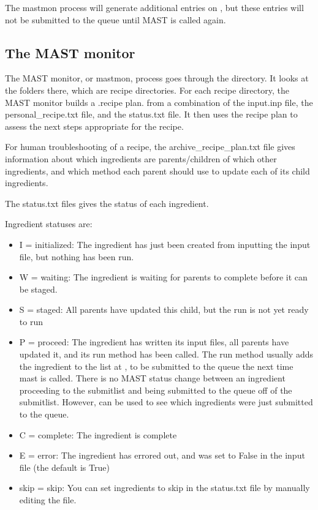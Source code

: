 \documentclass[letterpaper,10pt,english]{sphinxmanual}
\begin{document}
The mastmon process will generate additional entries on , but these entries will not be submitted to the queue until MAST is called again.


\subsection{The MAST monitor}
\label{5_0_runningmast:the-mast-monitor}
The MAST monitor, or mastmon, process goes through the  directory. It looks at the folders there, which are recipe directories. For each recipe directory, the MAST monitor builds a .recipe plan. from a combination of the input.inp file, the personal\_recipe.txt file, and the status.txt file. It then uses the recipe plan to assess the next steps appropriate for the recipe.

For human troubleshooting of a recipe, the archive\_recipe\_plan.txt file gives information about which ingredients are parents/children of which other ingredients, and which method each parent should use to update each of its child ingredients.

The status.txt files gives the status of each ingredient.

Ingredient statuses are:
\begin{itemize}
\item {} 
I = initialized: The ingredient has just been created from inputting the input file, but nothing has been run.

\item {} 
W = waiting: The ingredient is waiting for parents to complete before it can be staged.

\item {} 
S = staged: All parents have updated this child, but the run is not yet ready to run

\item {} 
P = proceed: The ingredient has written its input files, all parents have updated it, and its run method has been called. The run method usually adds the ingredient to the list at , to be submitted to the queue the next time mast is called. There is no MAST status change between an ingredient proceeding to the submitlist and being submitted to the queue off of the submitlist. However,  can be used to see which ingredients were just submitted to the queue.

\item {} 
C = complete: The ingredient is complete

\item {} 
E = error: The ingredient has errored out, and  was set to False in the input file (the default is True)

\item {} 
skip = skip: You can set ingredients to skip in the status.txt file by manually editing the file.

\end{itemize}
\end{document}
